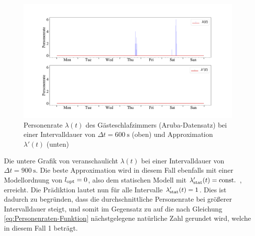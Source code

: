 \begin{figure}[!h]
	\begin{center}
		\includegraphics[width=\linewidth]{Abbildungen/evaluation/bin_size_influence_second_bedroom_float_600.pdf}
		\caption[Personenrate $\lambda (t)$ des Gästeschlafzimmers bei einer Intervalldauer von  $\Delta t = \SI{600}{\second}$ und Approximation $\lambda '(t)$]{Personenrate $\lambda (t)$ des Gästeschlafzimmers (Aruba-Datensatz) bei einer Intervalldauer von  $\Delta t = \SI{600}{\second}$ (oben) und Approximation $\lambda '(t)$ (unten)}
		\label{fig.bin_size_influence_second_bedroom_float_600.pdf}
	\end{center}
\end{figure}

Die untere Grafik von  veranschaulicht $\lambda (t)$ bei einer Intervalldauer von $\Delta t = \SI{900}{\second}$. Die beste Approximation wird in diesem Fall ebenfalls mit einer Modellordnung von $l_{\mathrm{opt}}=0$, also dem statischen Modell mit $\lambda_{\mathrm{stat}} ' (t) = \mathrm{const}.$ , erreicht. Die Prädiktion lautet nun für alle Intervalle $\lambda_{\mathrm{stat}} '(t) = 1$. Dies ist dadurch zu begründen, dass die durchschnittliche Personenrate bei größerer Intervalldauer steigt, und somit im Gegensatz zu  auf die nach Gleichung \ref{eq:Personenraten-Funktion} nächstgelegene natürliche Zahl gerundet wird, welche in diesem Fall 1 beträgt.


